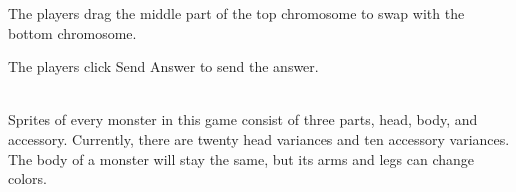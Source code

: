 \documentclass[12pt,oneside,openright,a4paper]{cpe-english-project}
\begin{document}
\begin{itemize}
	The players drag the middle part of the top chromosome to swap with the bottom chromosome. \\
	\begin{minipage}[c]{\textwidth}\centering {}  \end{minipage}
	The players click Send Answer to send the answer. \\
\end{itemize}
\newpage


 \\
Sprites of every monster in this game consist of three parts, head, body, and accessory. Currently, there are twenty head variances and ten accessory variances. The body of a monster will stay the same, but its arms and legs can change colors.
\end{document}
